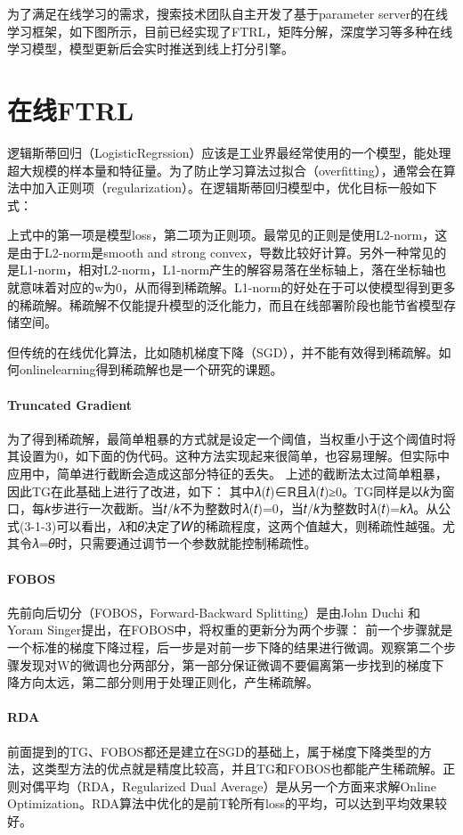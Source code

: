 为了满足在线学习的需求，搜索技术团队自主开发了基于parameter server的在线学习框架，如下图所示，目前已经实现了FTRL，矩阵分解，深度学习等多种在线学习模型，模型更新后会实时推送到线上打分引擎。

	
\section{在线FTRL}
逻辑斯蒂回归（LogisticRegrssion）应该是工业界最经常使用的一个模型，能处理超大规模的样本量和特征量。为了防止学习算法过拟合（overfitting），通常会在算法中加入正则项（regularization）。在逻辑斯蒂回归模型中，优化目标一般如下式：

上式中的第一项是模型loss，第二项为正则项。最常见的正则是使用L2-norm，这是由于L2-norm是smooth and strong convex，导数比较好计算。另外一种常见的是L1-norm，相对L2-norm，L1-norm产生的解容易落在坐标轴上，落在坐标轴也就意味着对应的w为0，从而得到稀疏解。L1-norm的好处在于可以使模型得到更多的稀疏解。稀疏解不仅能提升模型的泛化能力，而且在线部署阶段也能节省模型存储空间。

但传统的在线优化算法，比如随机梯度下降（SGD），并不能有效得到稀疏解。如何onlinelearning得到稀疏解也是一个研究的课题。

\paragraph{Truncated Gradient}
为了得到稀疏解，最简单粗暴的方式就是设定一个阈值，当权重小于这个阈值时将其设置为0，如下面的伪代码。这种方法实现起来很简单，也容易理解。但实际中应用中，简单进行截断会造成这部分特征的丢失。
上述的截断法太过简单粗暴，因此TG在此基础上进行了改进，如下：
其中𝜆(𝑡)∈ℝ且𝜆(𝑡)≥0。TG同样是以𝑘为窗口，每𝑘步进行一次截断。当𝑡/𝑘不为整数时𝜆(𝑡)=0，当𝑡/𝑘为整数时𝜆(𝑡)=𝑘𝜆。从公式(3-1-3)可以看出，𝜆和𝜃决定了𝑊的稀疏程度，这两个值越大，则稀疏性越强。尤其令𝜆=𝜃时，只需要通过调节一个参数就能控制稀疏性。

\paragraph{FOBOS}
先前向后切分（FOBOS，Forward-Backward Splitting）是由John Duchi 和Yoram Singer提出，在FOBOS中，将权重的更新分为两个步骤：
前一个步骤就是一个标准的梯度下降过程，后一步是对前一步下降的结果进行微调。观察第二个步骤发现对W的微调也分两部分，第一部分保证微调不要偏离第一步找到的梯度下降方向太远，第二部分则用于处理正则化，产生稀疏解。

\paragraph{RDA}
前面提到的TG、FOBOS都还是建立在SGD的基础上，属于梯度下降类型的方法，这类型方法的优点就是精度比较高，并且TG和FOBOS也都能产生稀疏解。正则对偶平均（RDA，Regularized Dual Average）是从另一个方面来求解Online Optimization。RDA算法中优化的是前T轮所有loss的平均，可以达到平均效果较好。

